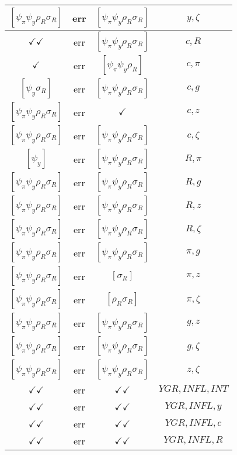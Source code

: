 \documentclass[a4paper,10pt]{article}
\begin{document}
\begin{longtable}{|c|c|c|c|}
\hline
$[\psi_\pi \psi_y \rho_R \sigma_R ]$ & err & $[\psi_\pi \psi_y \rho_R \sigma_R ]$ & ${y},{\zeta}$ \\
\hline
$\checkmark\checkmark$ & err & $[\psi_\pi \psi_y \rho_R \sigma_R ]$ & ${c},{R}$ \\
\hline
$\checkmark$ & err & $[\psi_\pi \psi_y \rho_R ]$ & ${c},{\pi}$ \\
\hline
$[\psi_y \sigma_R ]$ & err & $[\psi_\pi \psi_y \rho_R \sigma_R ]$ & ${c},{g}$ \\
\hline
$[\psi_\pi \psi_y \rho_R \sigma_R ]$ & err & $\checkmark$ & ${c},{z}$ \\
\hline
$[\psi_\pi \psi_y \rho_R \sigma_R ]$ & err & $[\psi_\pi \psi_y \rho_R \sigma_R ]$ & ${c},{\zeta}$ \\
\hline
$[\psi_y ]$ & err & $[\psi_\pi \psi_y \rho_R \sigma_R ]$ & ${R},{\pi}$ \\
\hline
$[\psi_\pi \psi_y \rho_R \sigma_R ]$ & err & $[\psi_\pi \psi_y \rho_R \sigma_R ]$ & ${R},{g}$ \\
\hline
$[\psi_\pi \psi_y \rho_R \sigma_R ]$ & err & $[\psi_\pi \psi_y \rho_R \sigma_R ]$ & ${R},{z}$ \\
\hline
$[\psi_\pi \psi_y \rho_R \sigma_R ]$ & err & $[\psi_\pi \psi_y \rho_R \sigma_R ]$ & ${R},{\zeta}$ \\
\hline
$[\psi_\pi \psi_y \rho_R \sigma_R ]$ & err & $[\psi_\pi \psi_y \rho_R \sigma_R ]$ & ${\pi},{g}$ \\
\hline
$[\psi_\pi \psi_y \rho_R \sigma_R ]$ & err & $[\sigma_R ]$ & ${\pi},{z}$ \\
\hline
$[\psi_\pi \psi_y \rho_R \sigma_R ]$ & err & $[\rho_R \sigma_R ]$ & ${\pi},{\zeta}$ \\
\hline
$[\psi_\pi \psi_y \rho_R \sigma_R ]$ & err & $[\psi_\pi \psi_y \rho_R \sigma_R ]$ & ${g},{z}$ \\
\hline
$[\psi_\pi \psi_y \rho_R \sigma_R ]$ & err & $[\psi_\pi \psi_y \rho_R \sigma_R ]$ & ${g},{\zeta}$ \\
\hline
$[\psi_\pi \psi_y \rho_R \sigma_R ]$ & err & $[\psi_\pi \psi_y \rho_R \sigma_R ]$ & ${z},{\zeta}$ \\
\hline
$\checkmark\checkmark$ & err & $\checkmark\checkmark$ & ${YGR},{INFL},{INT}$ \\
\hline
$\checkmark\checkmark$ & err & $\checkmark\checkmark$ & ${YGR},{INFL},{y}$ \\
\hline
$\checkmark\checkmark$ & err & $\checkmark\checkmark$ & ${YGR},{INFL},{c}$ \\
\hline
$\checkmark\checkmark$ & err & $\checkmark\checkmark$ & ${YGR},{INFL},{R}$ \\

\end{longtable}
\end{document}
